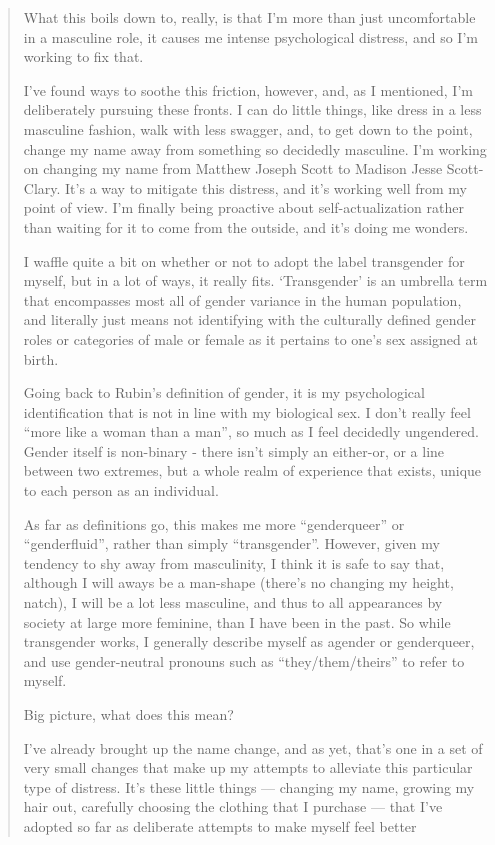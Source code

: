\begin{paracol}{2}
\begin{leftcolumn}
\begin{quotation}
What this boils down to, really, is that I'm more than just uncomfortable in a masculine role, it causes me intense psychological distress, and so I'm working to fix that.

I've found ways to soothe this friction, however, and, as I mentioned, I'm deliberately pursuing these fronts.  I can do little things, like dress in a less masculine fashion, walk with less swagger, and, to get down to the point, change my name away from something so decidedly masculine.  I'm working on changing my name from Matthew Joseph Scott to Madison Jesse Scott-Clary. It's a way to mitigate this distress, and it's working well from my point of view.  I'm finally being proactive about self-actualization rather than waiting for it to come from the outside, and it's doing me wonders.

I waffle quite a bit on whether or not to adopt the label transgender for myself, but in a lot of ways, it really fits.  `Transgender' is an umbrella term that encompasses most all of gender variance in the human population, and literally just means not identifying with the culturally defined gender roles or categories of male or female as it pertains to one's sex assigned at birth.

Going back to Rubin's definition of gender, it is my psychological identification that is not in line with my biological sex.  I don't really feel ``more like a woman than a man'', so much as I feel decidedly ungendered.  Gender itself is non-binary - there isn't simply an either-or, or a line between two extremes, but a whole realm of experience that exists, unique to each person as an individual.

As far as definitions go, this makes me more ``genderqueer'' or ``genderfluid'', rather than simply ``transgender''.  However, given my tendency to shy away from masculinity, I think it is safe to say that, although I will aways be a man-shape (there's no changing my height, natch), I will be a lot less masculine, and thus to all appearances by society at large more feminine, than I have been in the past.  So while transgender works, I generally describe myself as agender or genderqueer, and use gender-neutral pronouns such as ``they/them/theirs'' to refer to myself.

Big picture, what does this mean?

I've already brought up the name change, and as yet, that's one in a set of very small changes that make up my attempts to alleviate this particular type of distress.  It's these little things --- changing my name, growing my hair out, carefully choosing the clothing that I purchase --- that I've adopted so far as deliberate attempts to make myself feel better


\end{quotation}
\end{leftcolumn}
\end{paracol}
